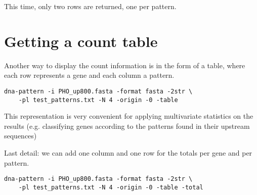 This time, only two rows are returned, one per pattern. 

\section{Getting a count table}

Another way to display the count information is in the form of a
table, where each row represents a gene and each column a pattern.

{\color{Blue} \begin{footnotesize} 
\begin{verbatim}
dna-pattern -i PHO_up800.fasta -format fasta -2str \
    -pl test_patterns.txt -N 4 -origin -0 -table
\end{verbatim} \end{footnotesize}
}

This representation is very convenient for applying multivariate
statistics on the results (e.g. classifying genes according to the
patterns found in their upstream sequences)

Last detail: we can add one column and one row for the totals per
gene and per pattern.

{\color{Blue} \begin{footnotesize} 
\begin{verbatim}
dna-pattern -i PHO_up800.fasta -format fasta -2str \
    -pl test_patterns.txt -N 4 -origin -0 -table -total
\end{verbatim} \end{footnotesize}
}

